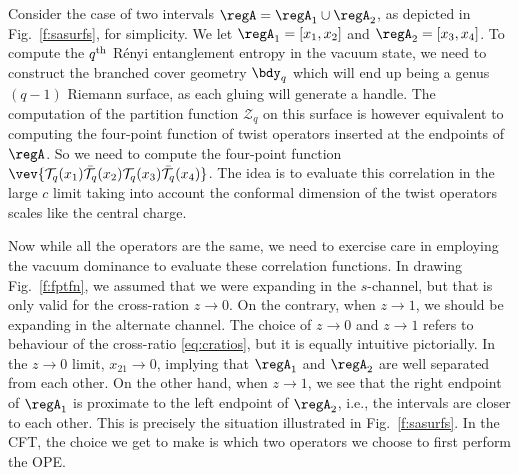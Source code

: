 \documentclass[12pt,openany]{book}
\begin{document}
Consider the case of two intervals $\regA = \regA_1 \cup \regA_2$, as depicted in  Fig.~\ref{f:sasurfs},  for simplicity. We let
$\regA_1 = [x_1,x_2]$ and $\regA_2 = [x_3,x_4]$. To compute the
 $q^{\rm th}$ R\'enyi entanglement entropy in the vacuum state, we need to construct the branched cover geometry $\bdy_q$ which will end up being a genus $(q-1)$ Riemann surface, as each gluing will generate a handle. The computation of the partition function $\mathcal{Z}_q$ on this surface is however equivalent to computing the four-point function of twist operators inserted at the endpoints of $\regA$. So we need to compute  the four-point function $\vev{{\cal T}_q(x_1)\bar{{\cal T}_q}(x_2){\cal T}_q(x_3)\bar{{\cal T}_q}(x_4)}$. The idea is to evaluate this correlation in the large $c$ limit taking into account the conformal dimension of the twist operators scales like the central charge.

Now while all the operators are the same, we need to exercise care in employing the vacuum dominance to evaluate these correlation functions.  In drawing  Fig.~\ref{f:fptfn}, we assumed that we were expanding in the $s$-channel, but that is only valid for the cross-ration $z \to 0$.
On the contrary, when $z \to 1$, we should be expanding in the alternate channel. The choice of $z\to0$ and $z\to1$ refers to behaviour of the cross-ratio \eqref{eq:cratios}, but it is equally intuitive pictorially. In the $z \to 0$ limit, $x_{21} \to 0$, implying that
$\regA_1$ and $\regA_2$ are well separated from each other. On the other hand, when $z\to 1$, we see that the right endpoint of $\regA_1$ is proximate to the left endpoint of $\regA_2$, i.e., the intervals are closer to each other. This is precisely the situation illustrated in Fig.~\ref{f:sasurfs}. In the CFT, the choice we get to make is which two operators we choose to first perform the OPE.
\end{document}
